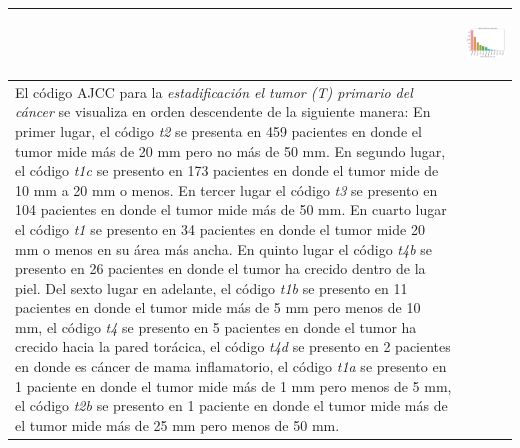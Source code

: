 \begin{table}[!htb]
\begin{threeparttable}
\begin{tabular}{p{8cm} p{7cm}}
			& \begin{center}\includegraphics[width=1\linewidth]{NOTEBOOK/IMAGENES_DESCRIPTIVAS/4_neoplasm_disease_stage_code}\end{center}
			\\ \hline
			El código AJCC para la \textit{estadificación el tumor (T) primario del cáncer} se visualiza en orden descendente de la siguiente manera: En primer lugar, el código \textit{t2} se presenta en 459 pacientes en donde el tumor mide más de 20 mm pero no más de 50 mm. En segundo lugar, el código \textit{t1c} se presento en 173 pacientes en donde el tumor mide  de 10 mm a 20 mm o menos. En tercer lugar el código \textit{t3} se presento en 104 pacientes en donde el tumor mide más de 50 mm. En cuarto lugar el código \textit{t1} se presento en 34 pacientes en donde el tumor  mide 20 mm o menos en su área más ancha. En quinto lugar el código \textit{t4b} se presento en 26 pacientes en donde el tumor ha crecido dentro de la piel. Del sexto lugar en adelante, el código \textit{t1b} se presento en 11 pacientes en donde el tumor mide más de 5 mm pero menos de 10 mm, el código \textit{t4} se presento en 5 pacientes en donde el tumor ha crecido hacia la pared torácica, el código \textit{t4d} se presento en 2 pacientes en donde es cáncer de mama inflamatorio, el código \textit{t1a} se presento en 1 paciente en donde el tumor mide más de 1 mm pero menos de 5 mm, el código \textit{t2b} se presento en 1 paciente en donde el tumor mide más de el tumor mide más de 25 mm pero menos de 50 mm.
			

\end{tabular}
\end{threeparttable}
\end{table}
